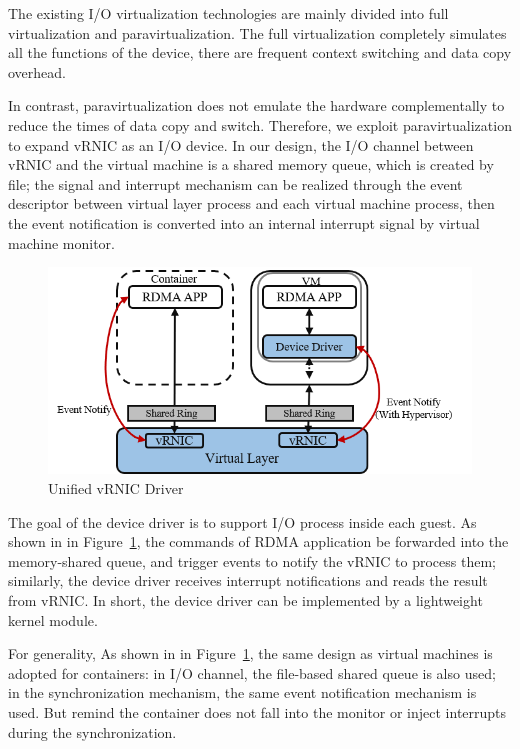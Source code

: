The existing I/O virtualization technologies are mainly divided into full virtualization and paravirtualization. The full virtualization completely simulates all the functions of the device, there are frequent context switching and data copy overhead. 

In contrast, paravirtualization does not emulate the hardware complementally to reduce the times of data copy and switch. Therefore, we exploit paravirtualization to expand vRNIC as an I/O device. In our design, the I/O channel between vRNIC and the virtual machine is a shared memory queue, which is created by file; the signal and interrupt mechanism can be realized through the event descriptor between virtual layer process and each virtual machine process, then the event notification is converted into an internal interrupt signal by virtual machine monitor.
	
	\begin{figure}[!ht]
		\centering
		\includegraphics[width=1.0\linewidth]{images/interface-general}
		\caption{Unified vRNIC Driver}
		\label{fig:vrnic-driver}
	\end{figure}
	
The goal of the device driver is to support I/O process inside each guest. As shown in in Figure~\ref{fig:vrnic-driver},  the commands of RDMA application be forwarded into the memory-shared queue, and trigger events to notify the vRNIC to process them; similarly, the device driver receives interrupt notifications and reads the result from vRNIC. In short, the device driver can be implemented by a lightweight kernel module.
	
For generality, As shown in in Figure~\ref{fig:vrnic-driver}, the same design as virtual machines is adopted for containers: in I/O channel, the file-based shared queue is also used; in the synchronization mechanism, the same event notification mechanism is used. But remind the container does not fall into the monitor or inject interrupts during the synchronization.

